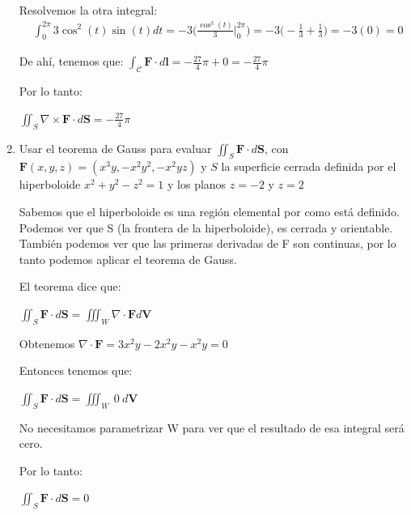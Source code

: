 \documentclass{article}
\begin{document}
\begin{enumerate}
{		Resolvemos la otra integral:
		\begin{align*}
                &\int_{0}^{2\pi}{3\cos^2(t)\sin(t)dt}
                = -3\Big( \frac{\cos^3(t)}{3}\Big |_{0}^{2\pi}\Big)
                = -3 \Big(-\frac{1}{3} + \frac{1}{3}\Big)
               	= -3 (0)
               	= 0
            \end{align*}

		De ahí, tenemos que:
		$\int_{\mathcal{C}} \mathbf{F} \cdot d\mathbf{l} = -\frac{27}{4}\pi + 0 = -\frac{27}{4}\pi$

		Por lo tanto:

		$\iint_{S} \nabla \times \mathbf{F} \cdot d\mathbf{S} = -\frac{27}{4}\pi$

        }

        \item {
            Usar el teorema de Gauss para evaluar $\displaystyle\iint_{S} \mathbf{F} \cdot d\mathbf{S}$, con $\mathbf{F}(x,y,z) = (x^3y,-x^2y^2,-x^2yz)$ y $S$ la superficie cerrada definida por el hiperboloide $x^2 + y^2 - z^2 = 1$ y los planos $z = -2$ y $z = 2$

            \color{azul}
            Sabemos que el hiperboloide es una región elemental por como está definido. Podemos ver que S (la frontera de la hiperboloide), es cerrada y orientable. También podemos ver que las primeras derivadas de F son continuas, por lo tanto podemos aplicar el teorema de Gauss.

            El teorema dice que:

            $\iint_{S} \mathbf{F} \cdot d\mathbf{S} = \iiint_{W} \nabla \cdot \mathbf{F} d\mathbf{V}$

            Obtenemos $\nabla \cdot \mathbf{F} = 3x^2y - 2x^2y - x^2y = 0$

            Entonces tenemos que:

             $\iint_{S} \mathbf{F} \cdot d\mathbf{S} = \iiint_{W} \ 0 \  d\mathbf{V}$

            No necesitamos parametrizar W para ver que el resultado de esa integral será cero.

            Por lo tanto:

            $\iint_{S} \mathbf{F} \cdot d\mathbf{S} = 0$



        }


\end{enumerate}
\end{document}
